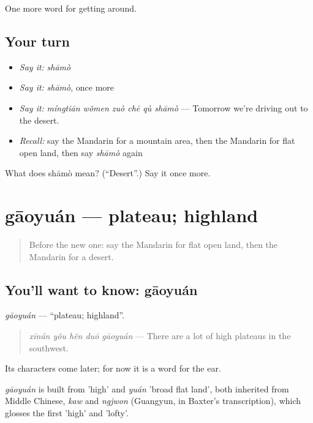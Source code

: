 \begin{grammarlens}[title={What you've built}]
One more word for getting around.
\end{grammarlens}

\subsection*{Your turn}
\begin{itemize}
\raggedright
  \item \emph{Say it:} \emph{shāmò}
  \item \emph{Say it:} \emph{shāmò}, once more
  \item \emph{Say it:} \emph{míngtiān wǒmen zuò chē qù shāmò} — Tomorrow we're driving out to the desert.
  \item \emph{Recall:} say the Mandarin for a mountain area, then the Mandarin for flat open land, then say \emph{shāmò} again
\end{itemize}

\begin{tcolorbox}[breakable,colback=teal!4,colframe=teal!35!black,title={Before you move on}]
What does shāmò mean? (\textquotedblleft{}Desert\textquotedblright{}.) Say it once more.
\end{tcolorbox}
\section[gāoyuán]{gāoyuán — plateau; highland}

\label{lesson:ZH-C437-gaoyuan}



\begin{quote}
Before the new one: say the Mandarin for flat open land, then the Mandarin for a desert.
\end{quote}

\subsection*{You'll want to know: gāoyuán}
\emph{gāoyuán} — \textquotedblleft{}plateau; highland\textquotedblright{}.

\begin{quote}
\emph{xīnán yǒu hěn duō gāoyuán} — There are a lot of high plateaus in the southwest.
\end{quote}

Its characters come later; for now it is a word for the ear.

\begin{cousinweb}
\emph{gāoyuán} is built from  'high' and \emph{yuán} 'broad flat land', both inherited from Middle Chinese, \emph{kaw} and \emph{ngjwon} (Guangyun, in Baxter's transcription), which glosses the first 'high' and 'lofty'.
\end{cousinweb}

